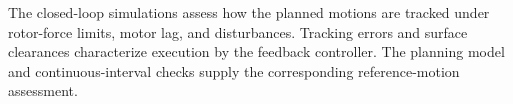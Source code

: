 


The closed-loop simulations assess how the planned motions are tracked under rotor-force limits, motor lag, and disturbances. Tracking errors and surface clearances characterize execution by the feedback controller. The planning model and continuous-interval checks supply the corresponding reference-motion assessment.
